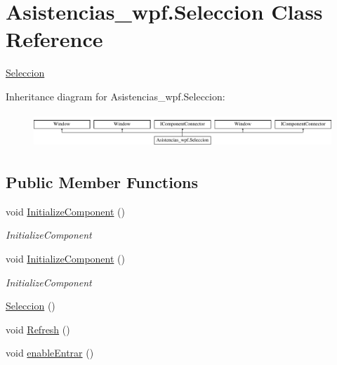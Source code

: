 \hypertarget{class_asistencias__wpf_1_1_seleccion}{\section{Asistencias\-\_\-wpf.\-Seleccion Class Reference}
\label{class_asistencias__wpf_1_1_seleccion}
}


\hyperlink{class_asistencias__wpf_1_1_seleccion}{Seleccion}  


Inheritance diagram for Asistencias\-\_\-wpf.\-Seleccion\-:\begin{figure}[H]
\begin{center}
\leavevmode
\includegraphics[height=1.309942cm]{d3/d56/class_asistencias__wpf_1_1_seleccion}
\end{center}
\end{figure}
\subsection*{Public Member Functions}
\begin{DoxyCompactItemize}
\item 
void \hyperlink{class_asistencias__wpf_1_1_seleccion_a62d8d645f31e081d2ed47c3e7032d62d}{Initialize\-Component} ()
\begin{DoxyCompactList}\small\item\em Initialize\-Component \end{DoxyCompactList}\item 
void \hyperlink{class_asistencias__wpf_1_1_seleccion_a62d8d645f31e081d2ed47c3e7032d62d}{Initialize\-Component} ()
\begin{DoxyCompactList}\small\item\em Initialize\-Component \end{DoxyCompactList}\item 
\hyperlink{class_asistencias__wpf_1_1_seleccion_a3886470baefe83a5d79efa21fb6fb998}{Seleccion} ()
\item 
void \hyperlink{class_asistencias__wpf_1_1_seleccion_ae40bbc95f8da07c171f7020538b02fb7}{Refresh} ()
\item 
void \hyperlink{class_asistencias__wpf_1_1_seleccion_a99b62e3ca34abcb65cd30635e90462f8}{enable\-Entrar} ()
\end{DoxyCompactItemize}
